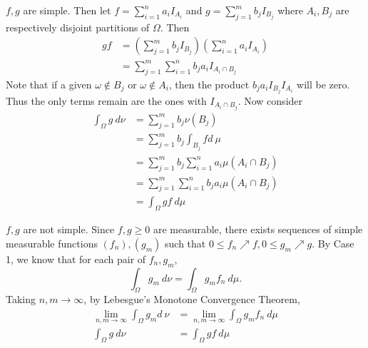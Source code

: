 \documentclass[12pt]{article}
\begin{document}
\begin{problem}[2]
\begin{case}[1]
$ f,g$ are simple. Then  let $ f= \sum_{ i= 1}^{ n} a_i I_{A_i}$ and $ g= \sum_{ j= 1}^{ m} b_j I_{B_j}$ where $ A_i, B_j$ are respectively disjoint partitions of $ \Omega$. Then
\begin{align*}
	gf &= \left( \sum_{ j= 1}^{ m} b_j I_{B_j} \right) \left( \sum_{ i= 1}^{ n} a_i I_{A_i} \right)  \\
	&= \sum_{ j= 1}^{ m} \sum_{ i= 1}^{ n} b_j a_i I_{A_i \cap B_j}
\end{align*}
Note that if a given $\omega \not\in B_j$ or $ \omega \not\in A_i$, then the product $ b_j a_i I_{B_j} I_{A_i}$ will be zero. Thus the only terms remain are the ones with $ I_{A_i \cap B_j}$. Now consider
\begin{align*}
	\int_{\Omega} g\ d \nu &= \sum_{ j= 1}^{ m} b_j \nu(B_j) \\
	&= \sum_{ j= 1}^{ m} b_j \int_{B_j} f d\ \mu \\
	&= \sum_{ j= 1}^{ m} b_j \sum_{ i= 1}^{ n} a_{i} \mu(A_i \cap B_j) \\
	&= \sum_{ j= 1}^{ m} \sum_{ i= 1}^{ n} b_j a_i \mu (A_i \cap B_j) \\
	&= \int_{\Omega} gf\ d \mu
\end{align*}
\end{case}
\begin{case}[2]
	$ f,g$ are not simple. Since $ f,g \geq 0$ are measurable, there exists sequences of simple measurable functions $ (f_n), (g_m)$ such that  $0\leq f_n \nearrow f , 0\leq g_m \nearrow g$. By Case 1, we know that for each pair of $ f_n, g_m$, 
	\[
	\int_{\Omega} g_m \ d \nu = \int_{\Omega} g_m f_n \ d \mu
	.\] 
Taking $ n,m \to \infty$, by Lebesgue's Monotone Convergence Theorem,
\begin{align*}
	\lim_{ n,m \to \infty} \int_{\Omega} g_m d\ \nu &= \lim_{ n,m \to \infty} \int_{\Omega} g_m f_n \ d \mu\\
	\int_{\Omega} g\ d\nu &= \int_{\Omega} gf\ d \mu \\
\end{align*}
\end{case}
\end{problem}
\end{document}
